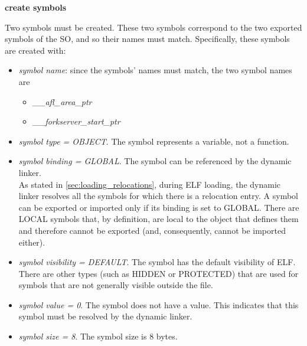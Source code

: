 \begin{center}
\textbf{create symbols}    
\end{center}
Two symbols must be created. These two symbols correspond to the two exported symbols of the \gls{SO}, and so their names must
match. Specifically, these symbols are created with:
\begin{itemize}
    \item \textit{symbol name}: since the symbols' names must match, the two symbol names are \begin{itemize}
        \item \textit{\_\_afl\_area\_ptr}
        \item \textit{\_\_forkserver\_start\_ptr}
    \end{itemize}
    \item \textit{symbol type = OBJECT}. The symbol represents a variable, not a function.
    \item \textit{symbol binding = GLOBAL}. The symbol can be referenced by the dynamic linker. \\As stated in
        \cref{sec:loading_relocations}, during \gls{ELF} loading, the dynamic linker resolves all the symbols for which there
        is a relocation entry. A symbol can be exported or imported only if its binding is set to GLOBAL.
        There are LOCAL symbols that, by definition, are local to the object that defines them and therefore cannot be exported
        (and, consequently, cannot be imported either).
    \item \textit{symbol visibility = DEFAULT}. The symbol has the default visibility of \gls{ELF}. There are other types
        (such as HIDDEN or PROTECTED) that are used for symbols that are not generally visible outside the file.
    \item \textit{symbol value = 0}. The symbol does not have a value. This indicates that this symbol
    must be resolved by the dynamic linker.
    \item \textit{symbol size = 8}. The symbol size is 8 bytes.
\end{itemize} 

